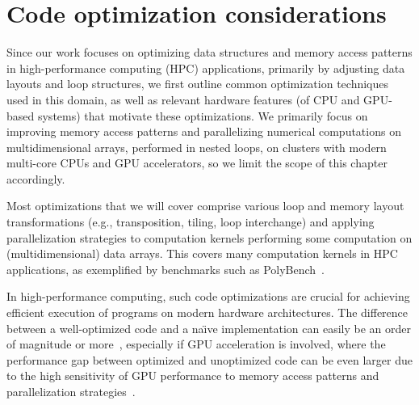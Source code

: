 \chapter{Code optimization considerations}\label{chap:code-optimization}


Since our work focuses on optimizing data structures and memory access patterns in high-performance computing (HPC) applications, primarily by adjusting data layouts and loop structures, we first outline common optimization techniques used in this domain, as well as relevant hardware features (of CPU and GPU-based systems) that motivate these optimizations. We primarily focus on improving memory access patterns and parallelizing numerical computations on multidimensional arrays, performed in nested loops, on clusters with modern multi-core CPUs and GPU accelerators, so we limit the scope of this chapter accordingly.


Most optimizations that we will cover comprise various loop and memory layout transformations (e.g., transposition, tiling, loop interchange) and applying parallelization strategies to computation kernels performing some computation on (multidimensional) data arrays. This covers many computation kernels in HPC applications, as exemplified by benchmarks such as PolyBench~\cite{bacon1994compiler,pouchet2012polybench}.

In high-performance computing, such code optimizations are crucial for achieving efficient execution of programs on modern hardware architectures. The difference between a well-optimized code and a na\"{\i}ve implementation can easily be an order of magnitude or more~\cite{hennessy2019computer}, especially if GPU acceleration is involved, where the performance gap between optimized and unoptimized code can be even larger due to the high sensitivity of GPU performance to memory access patterns and parallelization strategies~\cite{cuda_programming_guide}.

